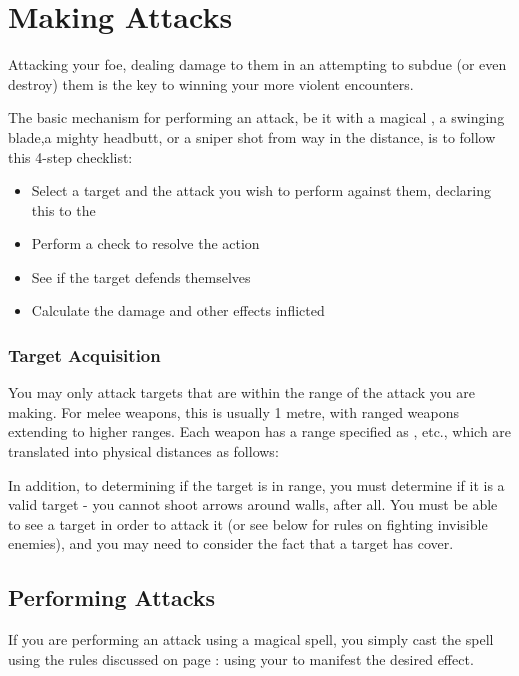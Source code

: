 
\chapter{Making Attacks}\label{S:Attacks} 

Attacking your foe, dealing damage to them in an attempting to subdue (or even destroy) them is the key to winning your more violent encounters. 

The basic mechanism for performing an attack, be it with a magical , a swinging blade,a mighty headbutt, or a sniper shot from way in the distance, is to follow this 4-step checklist:

\begin{itemize}
	\item Select a target and the attack you wish to perform against them, declaring this to the 
	\item Perform a check to resolve the action 
	\item See if the target defends themselves
	\item Calculate the damage and other effects inflicted
\end{itemize}

\subsection{Target Acquisition}

You may only attack targets that are within the range of the attack you are making. For melee weapons, this is usually 1 metre, with ranged weapons extending to higher ranges. Each weapon has a range specified as ,  etc., which are translated into physical distances as follows:

\rangetable{}

In addition, to determining if the target is in range, you must determine if it is a valid target - you cannot shoot arrows around walls, after all. You must be able to see a target in order to attack it (or see below for rules on fighting invisible enemies), and you may need to consider the fact that a target has cover. 

\section{Performing Attacks}

If you are performing an attack using a magical spell, you simply cast the spell using the rules discussed on page \pageref{S:CastingChecks}: using your  to manifest the desired effect. 

